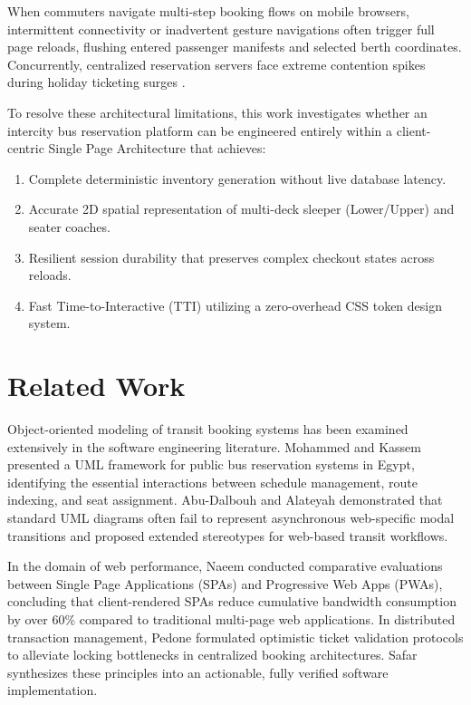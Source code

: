 \documentclass[conference]{IEEEtran}
\begin{document}
When commuters navigate multi-step booking flows on mobile browsers, intermittent connectivity or inadvertent gesture navigations often trigger full page reloads, flushing entered passenger manifests and selected berth coordinates. Concurrently, centralized reservation servers face extreme contention spikes during holiday ticketing surges \cite{pedone2001optimistic}.

To resolve these architectural limitations, this work investigates whether an intercity bus reservation platform can be engineered entirely within a client-centric Single Page Architecture that achieves:
\begin{enumerate}
    \item Complete deterministic inventory generation without live database latency.
    \item Accurate 2D spatial representation of multi-deck sleeper (Lower/Upper) and seater coaches.
    \item Resilient session durability that preserves complex checkout states across reloads.
    \item Fast Time-to-Interactive (TTI) utilizing a zero-overhead CSS token design system.
\end{enumerate}

\section{Related Work}
Object-oriented modeling of transit booking systems has been examined extensively in the software engineering literature. Mohammed and Kassem \cite{mohammed2020uml} presented a UML framework for public bus reservation systems in Egypt, identifying the essential interactions between schedule management, route indexing, and seat assignment. Abu-Dalbouh and Alateyah \cite{abudalbouh2020extension} demonstrated that standard UML diagrams often fail to represent asynchronous web-specific modal transitions and proposed extended stereotypes for web-based transit workflows.

In the domain of web performance, Naeem \cite{naeem2019performance} conducted comparative evaluations between Single Page Applications (SPAs) and Progressive Web Apps (PWAs), concluding that client-rendered SPAs reduce cumulative bandwidth consumption by over 60\% compared to traditional multi-page web applications. In distributed transaction management, Pedone \cite{pedone2001optimistic} formulated optimistic ticket validation protocols to alleviate locking bottlenecks in centralized booking architectures. Safar synthesizes these principles into an actionable, fully verified software implementation.
\end{document}
